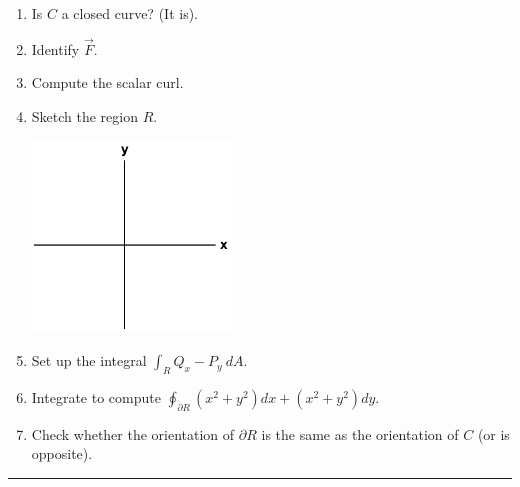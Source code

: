 \documentclass[12pt,letterpaper,noanswers]{exam}
\begin{document}
\begin{enumerate}
    \item Is $C$ a closed curve?  (It is).
    \item Identify $\vec F$.
    \vspace{0.5in}
    
    \item Compute the scalar curl.
    \vspace{1in}
    
    \item Sketch the region $R$.
    
    \includegraphics[height=2in]{img/C02axes-2.png}
    
    \item Set up the integral $\int_R Q_x - P_y \ dA$.
    \vspace{1in}
    
    \item Integrate to compute $\oint_{\partial R} (x^2+y^2)dx + (x^2+y^2)dy$.
    \vspace{1.5in}
    
    \item Check whether the orientation of $\partial R$ is the same as the orientation of $C$ (or is opposite).
\end{enumerate}

\vspace{0.2cm}
\hrule
\vspace{0.2cm}
\end{document}

